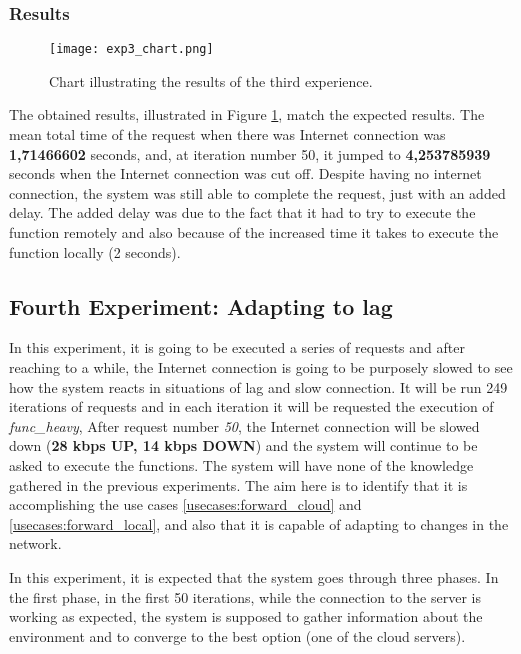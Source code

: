 \subsubsection{Results}

\begin{figure}[h]
  \begin{center}
    \texttt{[image: exp3\_chart.png]}
    \caption{Chart illustrating the results of the third experience.}
    \label{fig:exp3_chart}
  \end{center}
\end{figure}

The obtained results, illustrated in Figure \ref{fig:exp3_chart}, match the
expected results. The mean total time of the request when there was Internet
connection was \textbf{1,71466602} seconds, and, at iteration number 50, it
jumped to \textbf{4,253785939} seconds when the Internet connection was cut off.
Despite having no internet connection, the system was still able to complete the
request, just with an added delay. The added delay was due to the fact that it had
to try to execute the function remotely and also because of the increased time it
takes to execute the function locally (2 seconds). 

\subsection{Fourth Experiment: Adapting to lag}
\label{res:exp4}
In this experiment, it is going to be executed a series of requests and after
reaching to a while, the Internet connection is going to be purposely slowed to
see how the system reacts in situations of lag and slow connection. It will be run
249 iterations of requests and in each iteration it will be requested the
execution of \textit{func\_heavy}, After request number \textit{50}, the Internet
connection will be slowed down (\textbf{28 kbps UP, 14 kbps DOWN}) and the system
will continue to be asked to execute the functions. The system will have none of
the knowledge gathered in the previous experiments. The aim here is to identify
that it is accomplishing the use cases \ref{usecases:forward_cloud} and
\ref{usecases:forward_local}, and also that it is capable of adapting to changes
in the network.

In this experiment, it is expected that the system goes through three phases. In
the first phase, in the first 50 iterations, while the connection to the server is
working as expected, the system is supposed to gather information about the
environment and to converge to the best option (one of the cloud servers).

